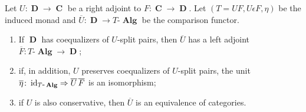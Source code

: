 \documentclass[a4paper,11pt,fullpage,oneside,openany]{amsbook}
\DeclareMathOperator{\Alg}{\mathbf{Alg}}
\DeclareMathOperator{\C}{\mathbf{C}}
\DeclareMathOperator{\D}{\mathbf{D}}
\DeclareMathOperator{\id}{id}
\theoremstyle{definition}
\theoremstyle{definition}
\theoremstyle{remark}
\begin{document}
\begin{teo}[Beck]\label{Beck} Let $U\colon\D\to\C$ be a right adjoint to $F\colon\C\to\D$. Let $(T=UF, U\epsilon F, \eta)$ be the induced monad and $\overline{U}\colon\D\to T\mbox{-}\Alg$ be the comparison functor. 
	\begin{enumerate}
		\item If $\D$ has coequalizers of $U$-split pairs, then $\overline{U}$ has a left adjoint $\overline{F}\colon T\mbox{-}\Alg\to\D$;
		\item if, in addition, $U$ preserves coequalizers of $U$-split pairs, the unit $\overline{\eta}\colon\id_{T\mbox{-}\Alg}\Rightarrow\overline{U}\hspace{.5mm} \overline{F}$ is an isomorphism;
		\item if $U$ is also conservative, then $\overline{U}$ is an equivalence of categories.
	\end{enumerate}
	\end{teo}
\end{document}
